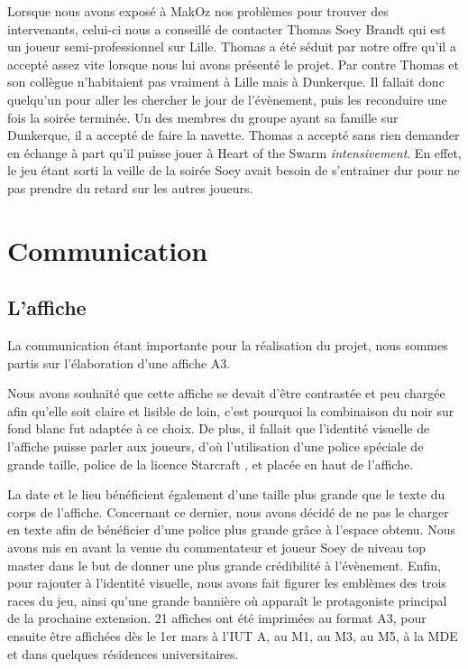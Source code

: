 Lorsque nous avons exposé à MakOz nos problèmes pour trouver des intervenants,
celui-ci nous a conseillé de contacter Thomas \og Soey \fg{} Brandt qui
est un joueur semi-professionnel sur Lille. Thomas a été séduit par
notre offre qu'il a accepté assez vite lorsque nous lui avons présenté
le projet. Par contre Thomas et son collègue n'habitaient pas vraiment à
Lille mais à Dunkerque. Il fallait donc quelqu'un pour aller les
chercher le jour de l'évènement, puis les reconduire une fois la soirée
terminée. Un des membres du groupe ayant sa famille sur Dunkerque, il a
accepté de faire la navette. Thomas a accepté sans rien demander en
échange à part qu'il puisse jouer à Heart of the Swarm
\emph{intensivement}.
En effet, le jeu étant sorti la veille de la soirée Soey avait besoin
de s'entrainer dur pour ne pas prendre du retard sur les autres joueurs.


\section{Communication}%
\label{sec:communication}

\subsection{L'affiche}%
\label{sub:l_affiche}

La communication étant importante pour la réalisation du projet, nous sommes partis sur l'élaboration
d'une affiche A3.

Nous avons souhaité que cette affiche se devait d’être contrastée et peu chargée afin qu’elle soit
claire et lisible de loin, c’est pourquoi la combinaison du noir sur fond blanc fut adaptée à ce choix.
De plus, il fallait que l’identité visuelle de l’affiche puisse parler aux joueurs, d’où l’utilisation
d’une police spéciale de grande taille, police de la licence \og Starcraft \fg{}, et placée en haut de l’affiche.

La date et le lieu bénéficient également d’une taille plus grande que le texte du corps de l’affiche.
Concernant ce dernier, nous avons décidé de ne pas le charger en texte afin de bénéficier d’une police
plus grande grâce à l’espace obtenu.
Nous avons mis en avant la venue du commentateur et joueur Soey de niveau \og top master \fg{} dans le but
de donner une plus grande crédibilité à l’évènement.
Enfin, pour rajouter à l’identité visuelle, nous avons fait figurer les emblèmes des trois races du jeu,
ainsi qu’une grande bannière où apparaît le protagoniste principal de la prochaine extension.
21 affiches ont été imprimées au format A3, pour ensuite être affichées dès le 1er mars à l’IUT A, au M1,
au M3, au M5, à la MDE et dans quelques résidences universitaires.

